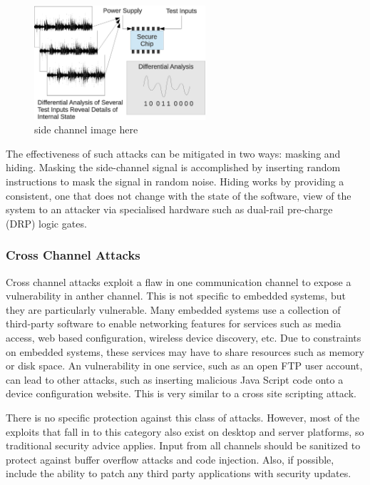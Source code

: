 \documentclass[final,conference,11pt]{IEEEtran}
\begin{document}
\begin{figure}[!t]
\centering
\includegraphics[width=2.5in]{diffpower}
\caption{side channel image here}
\label{fig:side_chan}
\end{figure}

The effectiveness of such attacks can be mitigated in two ways: masking and hiding.  Masking the side-channel signal is accomplished by inserting random instructions to mask the signal in random noise.  Hiding works by providing a consistent, one that does not change with the state of the software, view of the system to an attacker via specialised hardware such as dual-rail pre-charge (DRP) logic gates.\cite{papers??}

\subsubsection{Cross Channel Attacks}
Cross channel attacks exploit a flaw in one communication channel to expose a vulnerability in anther channel.  This is not specific to embedded systems, but they are particularly vulnerable.  Many embedded systems use a collection of third-party software to enable networking features for services such as media access, web based configuration, wireless device discovery, etc.  Due to constraints on embedded systems, these services may have to share resources such as memory or disk space.   An vulnerability in one service, such as an open FTP user account, can lead to other attacks, such as inserting malicious Java Script code onto a device configuration website.  This is very similar to a cross site scripting attack.

There is no specific protection against this class of attacks.  However, most of the exploits that fall in to this category also exist on desktop and server platforms, so traditional security advice applies.  Input from all channels should be sanitized to protect against buffer overflow attacks and code injection.  Also, if possible, include the ability to patch any third party applications with security updates. \cite{emerge ccs paper}
\end{document}
